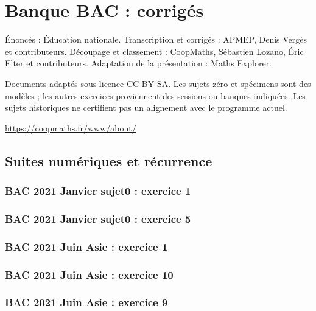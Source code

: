 \documentclass[lang=fr,edition=teacher,layout=sheet]{mxbook}
\begin{document}
\chapter*{Banque BAC : corrigés}
Énoncés : Éducation nationale. Transcription et corrigés : APMEP, Denis Vergès et contributeurs. Découpage et classement : CoopMaths, Sébastien Lozano, Éric Elter et contributeurs. Adaptation de la présentation : Maths Explorer.\par\medskip
\noindent Documents adaptés sous licence CC BY-SA. Les sujets zéro et spécimens sont des modèles ; les autres exercices proviennent des sessions ou banques indiquées. Les sujets historiques ne certifient pas un alignement avec le programme actuel.
\par\smallskip\url{https://coopmaths.fr/www/about/}
\clearpage\section*{Suites numériques et récurrence}
\subsection*{BAC 2021 Janvier sujet0 : exercice 1}
\begingroup\endgroup
\par\bigskip
{}\subsection*{BAC 2021 Janvier sujet0 : exercice 5}
\begingroup\endgroup
\par\bigskip
{}\subsection*{BAC 2021 Juin Asie : exercice 1}
\begingroup\endgroup
\par\bigskip
{}\subsection*{BAC 2021 Juin Asie : exercice 10}
\begingroup\endgroup
\par\bigskip
{}\subsection*{BAC 2021 Juin Asie : exercice 9}
\end{document}
